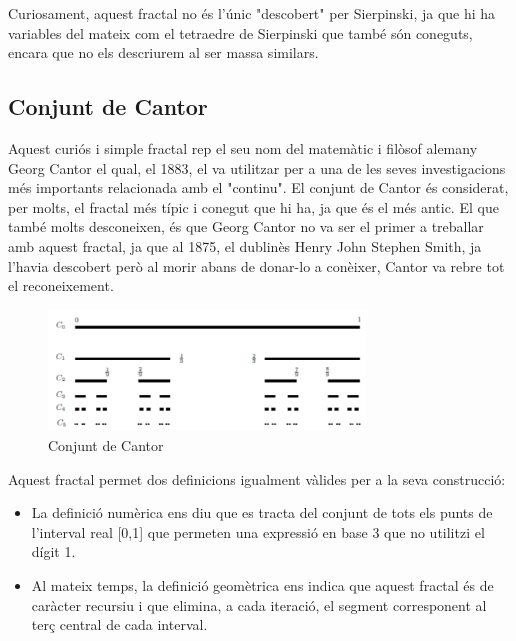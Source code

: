 \documentclass[12pt]{report}
\begin{document}
Curiosament, aquest fractal no és l'únic "descobert" per Sierpinski, ja que hi ha variables del mateix com el tetraedre de Sierpinski que també són coneguts, encara que no els descriurem al ser massa similars.
\newpage
\subsection{Conjunt de Cantor}
Aquest curiós i simple fractal rep el seu nom del matemàtic i filòsof alemany Georg Cantor el qual, el 1883, el va utilitzar per a una de les seves investigacions més importants relacionada amb el "continu".
\newline
El conjunt de Cantor és considerat, per molts, el fractal més típic i conegut que hi ha, ja que és el més antic. El que també molts desconeixen, és que Georg Cantor no va ser el primer a treballar amb aquest fractal, ja que al 1875, el dublinès Henry John Stephen Smith, ja l'havia descobert però al morir abans de donar-lo a conèixer, Cantor va rebre tot el reconeixement.
\begin{figure}[H]
    \centering
   \includegraphics[width=0.75\textwidth]{cantor.PNG}
   \caption{Conjunt de Cantor}
\end{figure}
Aquest fractal permet dos definicions igualment vàlides per a la seva construcció:
\begin{itemize}
\item La definició numèrica ens diu que es tracta del conjunt de tots els punts de l'interval real [0,1] que permeten una expressió en base 3 que no utilitzi el dígit 1.
\end{itemize}
\begin{itemize}
\item Al mateix temps, la definició geomètrica ens indica que aquest fractal és de caràcter recursiu i que elimina, a cada iteració, el segment corresponent al terç central de cada interval.
\end{itemize}
\end{document}
